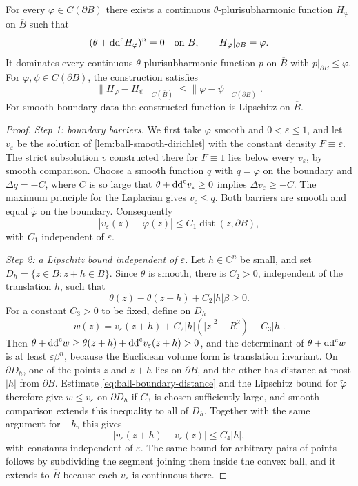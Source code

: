 \begin{theorem}\label{thm:ball-homogeneous-replacement}
For every $\varphi\in C(\partial B)$ there exists a continuous $\theta$-plurisubharmonic function $H_\varphi$ on $\overline B$ such that
\[
 (\theta+\mathrm{dd}^{\mathrm{c}} H_\varphi)^n=0\quad\hbox{on }B,
 \qquad H_\varphi|_{\partial B}=\varphi.
\]
It dominates every continuous $\theta$-plurisubharmonic function $p$ on $\overline B$ with $p|_{\partial B}\leq\varphi$. For $\varphi,\psi\in C(\partial B)$, the construction satisfies
\[
 \|H_\varphi-H_\psi\|_{C(\overline B)}
       \leq\|\varphi-\psi\|_{C(\partial B)}.
\]
For smooth boundary data the constructed function is Lipschitz on $\overline B$.
\end{theorem}
\begin{proof}
\emph{Step 1: boundary barriers.} We first take $\varphi$ smooth and $0<\varepsilon\leq1$, and let $v_\varepsilon$ be the solution of \cref{lem:ball-smooth-dirichlet} with the constant density $F\equiv\varepsilon$. The strict subsolution $\underline v$ constructed there for $F\equiv1$ lies below every $v_\varepsilon$, by smooth comparison. Choose a smooth function $q$ with $q=\varphi$ on the boundary and $\Delta q=-C$, where $C$ is so large that $\theta+\mathrm{dd}^{\mathrm{c}} v_\varepsilon\geq0$ implies $\Delta v_\varepsilon\geq-C$. The maximum principle for the Laplacian gives $v_\varepsilon\leq q$. Both barriers are smooth and equal $\widetilde\varphi$ on the boundary. Consequently
\begin{equation}\label{eq:ball-boundary-distance}
 |v_\varepsilon(z)-\widetilde\varphi(z)|
       \leq C_1\operatorname{dist}(z,\partial B),
\end{equation}
with $C_1$ independent of $\varepsilon$.

\emph{Step 2: a Lipschitz bound independent of $\varepsilon$.} Let $h\in\mathbb C^n$ be small, and set $D_h=\{z\in B:z+h\in B\}$. Since $\theta$ is smooth, there is $C_2>0$, independent of the translation $h$, such that
\[
 \theta(z)-\theta(z+h)+C_2|h|\beta\geq0.
\]
For a constant $C_3>0$ to be fixed, define on $D_h$
\[
 w(z)=v_\varepsilon(z+h)
          +C_2|h|(|z|^2-R^2)-C_3|h|.
\]
Then $\theta+\mathrm{dd}^{\mathrm{c}} w\geq\theta(z+h)+\mathrm{dd}^{\mathrm{c}} v_\varepsilon(z+h)>0$, and the determinant of $\theta+\mathrm{dd}^{\mathrm{c}} w$ is at least $\varepsilon\beta^n$, because the Euclidean volume form is translation invariant. On $\partial D_h$, one of the points $z$ and $z+h$ lies on $\partial B$, and the other has distance at most $|h|$ from $\partial B$. Estimate \eqref{eq:ball-boundary-distance} and the Lipschitz bound for $\widetilde\varphi$ therefore give $w\leq v_\varepsilon$ on $\partial D_h$ if $C_3$ is chosen sufficiently large, and smooth comparison extends this inequality to all of $D_h$. Together with the same argument for $-h$, this gives
\[
 |v_\varepsilon(z+h)-v_\varepsilon(z)|\leq C_4|h|,
\]
with constants independent of $\varepsilon$. The same bound for arbitrary pairs of points follows by subdividing the segment joining them inside the convex ball, and it extends to $\overline B$ because each $v_\varepsilon$ is continuous there.


\end{proof}
